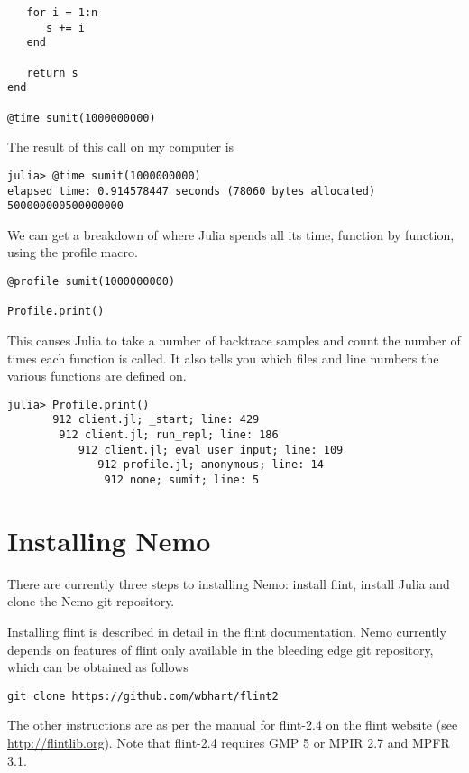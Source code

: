 \documentclass[a4paper,10pt]{article}
\begin{document}
{{{{\begin{lstlisting}
   for i = 1:n
      s += i
   end

   return s
end

@time sumit(1000000000)
\end{lstlisting}

The result of this call on my computer is

\begin{verbatim}
julia> @time sumit(1000000000)
elapsed time: 0.914578447 seconds (78060 bytes allocated)
500000000500000000
\end{verbatim}

We can get a breakdown of where Julia spends all its time, function by function,
using the profile macro.

\begin{lstlisting}
@profile sumit(1000000000)

Profile.print()
\end{lstlisting}

This causes Julia to take a number of backtrace samples and count the number of times
each function is called. It also tells you which files and line numbers the various
functions are defined on.

\begin{verbatim}
julia> Profile.print()
       912 client.jl; _start; line: 429
        912 client.jl; run_repl; line: 186
           912 client.jl; eval_user_input; line: 109
              912 profile.jl; anonymous; line: 14
               912 none; sumit; line: 5
\end{verbatim}

\section{Installing Nemo}

There are currently three steps to installing Nemo: install flint, install Julia and
clone the Nemo git repository.

Installing flint is described in detail in the flint documentation. Nemo currently
depends on features of flint only available in the bleeding edge git repository,
which can be obtained as follows

\begin{verbatim}
git clone https://github.com/wbhart/flint2
\end{verbatim}

The other instructions are as per the manual for flint-2.4 on the flint website (see
\url{http://flintlib.org}). Note that flint-2.4 requires GMP 5 or MPIR 2.7 and MPFR
3.1.

}}}}
\end{document}
